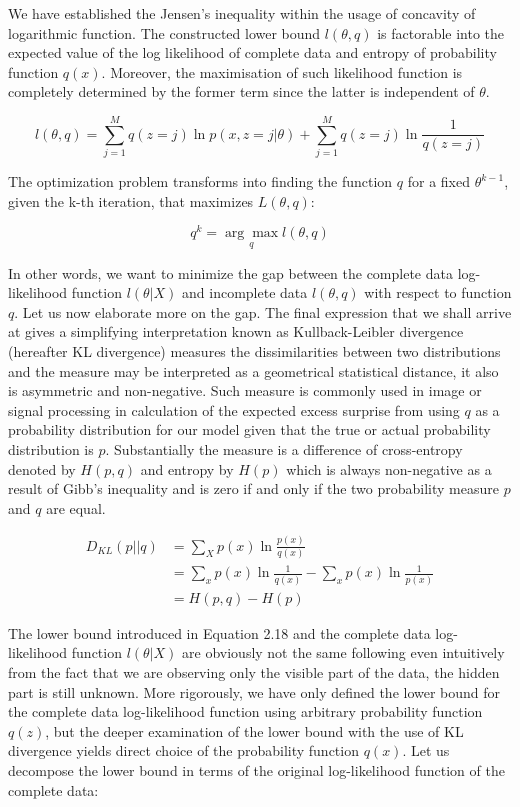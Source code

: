 We have established the Jensen's inequality within the usage of concavity of logarithmic function. The constructed lower bound $l(\theta,q)$ is factorable into the expected value of the log likelihood of complete data and entropy of probability function $q(x)$. Moreover, the maximisation of such likelihood function is completely determined by the former term since the latter is independent of $\theta$.

\begin{equation}
l(\theta,q) = \sum_{j=1}^{M} q(z = j) \ln p(x, z = j|\theta) + \sum_{j=1}^{M} q(z = j) \ln \frac{1}{q(z = j)}
\end{equation}

The optimization problem transforms into finding the function $q$ for a fixed $\theta^{k-1}$, given the k-th iteration, that maximizes $L(\theta, q)$:

\begin{equation}
q^{k} = \underset{q}{\arg\max} l(\theta, q)
\end{equation}

In other words, we want to minimize the gap between the complete data log-likelihood function $l(\theta|X)$ and incomplete data $l(\theta, q)$ with respect to function $q$. Let us now elaborate more on the gap. The final expression that we shall arrive at gives a simplifying interpretation known as Kullback-Leibler divergence (hereafter KL divergence) measures the dissimilarities between two distributions and the measure may be interpreted as a geometrical statistical distance, it also is asymmetric and non-negative. Such measure is commonly used in image or signal processing in calculation of the expected excess surprise from using $q$ as a probability distribution for our model given that the true or actual probability distribution is $p$. Substantially the measure is a difference of cross-entropy denoted by $H(p,q)$ and entropy by $H(p)$ which is always non-negative as a result of Gibb's inequality and is zero if and only if the two probability measure $p$ and $q$ are equal.

\begin{align}
D_{KL} (p || q) &= \sum_{X} p(x) \ln \frac{p(x)}{q(x)} \\
& = \sum_{x} p(x) \ln \frac{1}{q(x)} - \sum_{x} p(x) \ln \frac{1}{p(x)} \\
& = H(p,q) - H(p)
\end{align}

The lower bound introduced in Equation 2.18 and the complete data log-likelihood function $l(\theta|X)$ are obviously not the same following even intuitively from the fact that we are observing only the visible part of the data, the hidden part is still unknown. More rigorously, we have only defined the lower bound for the complete data log-likelihood function using arbitrary probability function $q(z)$, but the deeper examination of the lower bound with the use of KL divergence yields direct choice of the probability function $q(x)$. Let us decompose the lower bound in terms of the original log-likelihood function of the complete data:

